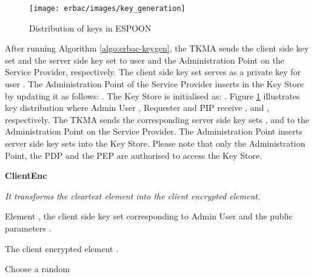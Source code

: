 \documentclass[epsfig,a4paper,11pt,titlepage]{book}
\numberwithin{algorithm}{chapter}
\newcommand{\algofontsize}{\fontsize{11}{12}\selectfont}
\begin{document}
\begin{figure} [htp]
\centering
\texttt{[image: erbac/images/key\_generation]} \caption[Distribution of keys in ESPOON]{Distribution of keys in \gls{ESPOON}}
\label{fig:erbac-key_generation}
\end{figure}

After running Algorithm \ref{algo:erbac-keygen}, the \gls{TKMA} sends the client side key set  and the server side key set  to user  and the Administration Point on the Service Provider, respectively. The client side key set  serves as a private key for user . The Administration Point of the Service Provider inserts  in the Key Store by updating it as follows: . The Key Store is initialised as: . Figure \ref{fig:erbac-key_generation} illustrates key distribution where Admin User , Requester  and \gls{PIP}  receive ,  and , respectively. The \gls{TKMA} sends the corresponding server side key sets ,  and  to the Administration Point on the Service Provider. The Administration Point inserts server side key sets into the Key Store. Please note that only the Administration Point, the \gls{PDP} and the \gls{PEP} are authorised to access the Key Store.



\begin{algorithm} [htp]
{\algofontsize
\caption{\textbf{ClientEnc}}

\label{algo:erbac-client-enc}

\begin{algorithmic}[1]

\INPUT \emph{It transforms the cleartext element into the client encrypted element.}

\Require Element , the client side key set  corresponding to Admin User  and the public parameters .

\Ensure The client encrypted element .

\medskip

\State Choose a random  \label{line:erbac-ce-r}
\State  \label{line:erbac-ce-sigma}
\State  \label{line:erbac-ce-c1}
\State  \label{line:erbac-ce-c2}
\State  \label{line:erbac-ce-c3}
\State  \label{line:erbac-ce-c}

\Return 

\end{algorithmic}
}
\end{algorithm}
\end{document}
